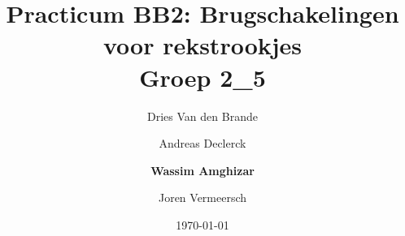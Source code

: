 \documentclass[12pt]{article}
\begin{document}
    \title{\textbf{Practicum BB2: Brugschakelingen voor rekstrookjes} \\\small{Groep 2\_5}}
    \author{Dries Van den Brande \and Andreas Declerck \and \textbf{Wassim Amghizar} \and Joren Vermeersch}
    \date{\today}

    \maketitle

    

    

    

    

    

    

    

    

    
\end{document}
